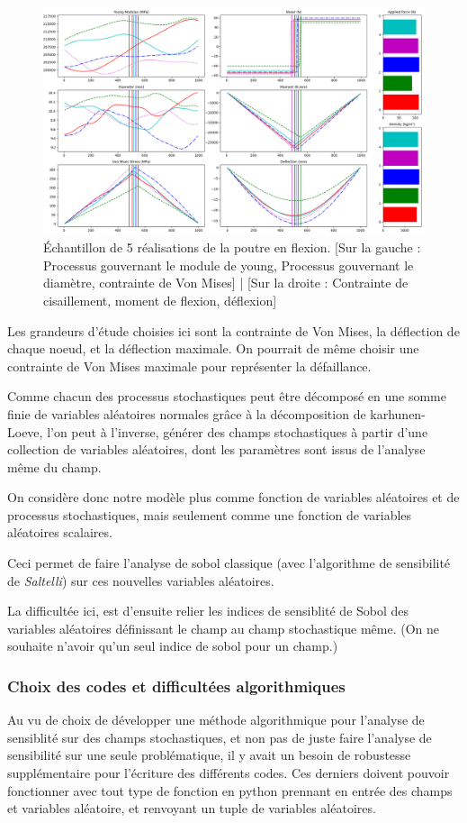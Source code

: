 \documentclass[a4paper,10pt]{article}
\begin{document}
\begin{figure}[H]
   \centering   
   \includegraphics[scale=0.33]{beam_experience.png}
      \caption{Échantillon de 5 réalisations de la poutre en flexion. [Sur la gauche : Processus gouvernant le module de young, Processus gouvernant le diamètre, contrainte de Von Mises] | [Sur la droite : Contrainte de cisaillement, moment de flexion, déflexion] }
         \label{beamExperience}
\end{figure}

Les grandeurs d'étude choisies ici sont la contrainte de Von Mises, la déflection de chaque noeud, et la déflection maximale. On pourrait de même choisir une contrainte de Von Mises maximale pour représenter la défaillance. 

Comme chacun des processus stochastiques peut être décomposé en une somme finie de variables aléatoires normales grâce à la décomposition de karhunen-Loeve, l'on peut à l'inverse, générer des champs stochastiques à partir d'une collection de variables aléatoires, dont les paramètres sont issus de l'analyse même du champ.

On considère donc notre modèle plus comme fonction de variables aléatoires et de processus stochastiques, mais seulement comme une fonction de variables aléatoires scalaires.

Ceci permet de faire l'analyse de sobol classique (avec l'algorithme de sensibilité de \textit{Saltelli}) sur ces nouvelles variables aléatoires.

La difficultée ici, est d'ensuite relier les indices de sensiblité de Sobol des variables aléatoires définissant le champ au champ stochastique même. (On ne souhaite n'avoir qu'un seul indice de sobol pour un champ.) 

\subsubsection{Choix des codes et difficultées algorithmiques}
Au vu de choix de développer une méthode algorithmique pour l'analyse de sensiblité sur des champs stochastiques, et non pas de juste faire l'analyse de sensibilité sur une seule problématique, il y avait un besoin de robustesse supplémentaire pour l'écriture des différents codes. Ces derniers doivent pouvoir fonctionner avec tout type de fonction en python prennant en entrée des champs et variables aléatoire, et renvoyant un tuple de variables aléatoires. 
\end{document}

